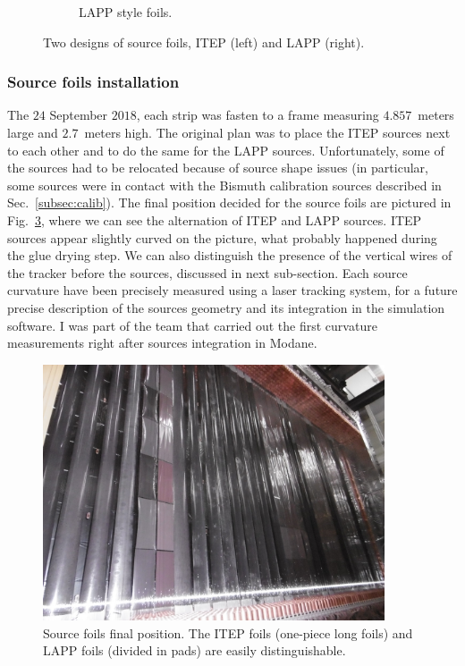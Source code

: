 \begin{figure}[h!]
\begin{subfigure}[t]{0.49\textwidth}
\captionsetup{justification=centering}
\caption{LAPP style foils.
\label{subfig:LAPP_foils}}
\end{subfigure}
\caption{Two designs of source foils, ITEP (left) and LAPP (right).
\label{fig:foils_design}}
\end{figure}

\subsubsection*{Source foils installation}
The $24$ September $2018$, each strip was fasten to a frame measuring $4.857$~meters large and $2.7$~meters high.
The original plan was to place the ITEP sources next to each other and to do the same for the LAPP sources.
Unfortunately, some of the sources had to be relocated because of source shape issues (in particular, some sources were in contact with the Bismuth calibration sources described in Sec.~\ref{subsec:calib}).
The final position decided for the source foils are pictured in Fig.~\ref{fig:source_foils_installation}, where we can see the alternation of ITEP and LAPP sources.
ITEP sources appear slightly curved on the picture, what probably happened during the glue drying step.
We can also distinguish the presence of the vertical wires of the tracker before the sources, discussed in next sub-section.
Each source curvature have been precisely measured using a laser tracking system, for a future precise description of the sources geometry and its integration in the simulation software.
I was part of the team that carried out the first curvature measurements right after sources integration in Modane.
\begin{figure}[h!]
\centering
\includegraphics[width=0.9\textwidth]{SNdemonstrator/fig_SNdemonstrator/sources_installed.jpg}
\caption{Source foils final position.
  The ITEP foils (one-piece long foils) and LAPP foils (divided in pads) are easily distinguishable.
  \label{fig:source_foils_installation}}
\end{figure}


